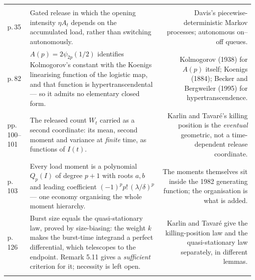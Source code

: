 \vspace{0.35\baselineskip}
{\footnotesize
\begin{xltabular}{\linewidth}{@{}WZN@{}}
\toprule
{} &  &  \\
\midrule
\endfirsthead
\toprule
{} &  &  \\
\midrule
\endhead
\bottomrule
\endlastfoot

\newline p.\,35 &
Gated release in which the opening intensity $\eta A_t$ depends on the accumulated load,
rather than switching autonomously. &
Davis's piecewise-deterministic Markov processes; autonomous on--off queues. \\
\addlinespace[3pt]

\newline p.\,82 &
$A(p)=2\psi_{2p}(1/2)$ identifies Kolmogorov's constant with the Koenigs linearising
function of the logistic map, and that function is hypertranscendental --- so it admits no
elementary closed form. &
Kolmogorov (1938) for $A(p)$ itself; Koenigs (1884); Becker and Bergweiler (1995) for
hypertranscendence. \\
\addlinespace[3pt]

\newline pp.\,100--101 &
The released count $W_t$ carried as a second coordinate: its mean, second moment and
variance at \emph{finite} time, as functions of $I(t)$. &
Karlin and Tavar\'e's killing position is the \emph{eventual} geometric, not a
time-dependent release coordinate. \\
\addlinespace[3pt]

\newline p.\,103 &
Every load moment is a polynomial $Q_p(I)$ of degree $p+1$ with roots $a,b$ and leading
coefficient $(-1)^p p!\,(\lambda/\delta)^p$ --- one economy organising the whole moment
hierarchy. &
The moments themselves sit inside the 1982 generating function; the organisation is what
is added. \\
\addlinespace[3pt]

\newline p.\,126 &
Burst size equals the quasi-stationary law, proved by size-biasing: the weight $k$ makes
the burst-time integrand a perfect differential, which telescopes to the endpoint.
Remark 5.11 gives a \emph{sufficient} criterion for it; necessity is left open. &
Karlin and Tavar\'e give the killing-position law and the quasi-stationary law separately,
in different lemmas. \\
\addlinespace[3pt]


\end{xltabular}}
